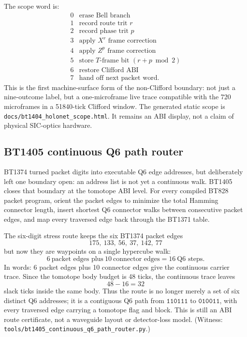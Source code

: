 \documentclass[11pt]{article}
\begin{document}
The scope word is:
\[
\begin{array}{c|l}
0 & \text{erase Bell branch}\\
1 & \text{record route trit }r\\
2 & \text{record phase trit }p\\
3 & \text{apply }X^r\text{ frame correction}\\
4 & \text{apply }Z^p\text{ frame correction}\\
5 & \text{store }T\text{-frame bit }(r+p\bmod 2)\\
6 & \text{restore Clifford ABI}\\
7 & \text{hand off next packet word.}
\end{array}
\]
This is the first machine-surface form of the non-Clifford boundary: not just a
nine-outcome label, but a one-microframe live trace compatible with the 720
microframes in a 51840-tick Clifford window.  The generated static scope is
\texttt{docs/bt1404\_holonet\_scope.html}.  It remains an ABI display, not a
claim of physical SIC-optics hardware.

\subsection{BT1405 continuous Q6 path router}

BT1374 turned packet digits into executable Q6 edge addresses, but deliberately
left one boundary open: an address list is not yet a continuous walk.  BT1405
closes that boundary at the tomotope ABI level.  For every compiled BT828 packet
program, orient the packet edges to minimize the total Hamming connector length,
insert shortest Q6 connector walks between consecutive packet edges, and map
every traversed edge back through the BT1371 table.

The six-digit stress route keeps the six BT1374 packet edges
\[
  175,\ 133,\ 56,\ 37,\ 142,\ 77
\]
but now they are waypoints on a single hypercube walk:
\[
  6\ \text{packet edges plus}\ 10\ \text{connector edges}
  =16\ \text{Q6 steps}.
\]
In words: 6 packet edges plus 10 connector edges give the continuous carrier
trace.
Since the tomotope body budget is 48 ticks, the continuous trace leaves
\[
  48-16=32
\]
slack ticks inside the same body.  Thus the route is no longer merely a set of
six distinct Q6 addresses; it is a contiguous Q6 path from
\(\texttt{110111}\) to \(\texttt{010011}\), with every traversed edge carrying a
tomotope flag and block.  This is still an ABI route certificate, not a
waveguide layout or detector-loss model.  (Witness:
\texttt{tools/bt1405\_continuous\_q6\_path\_router.py}.)
\end{document}
